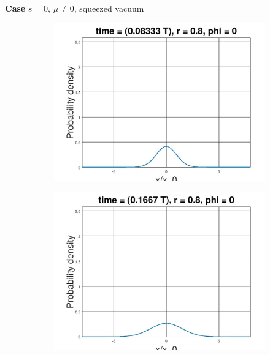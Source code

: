 \documentclass[12pt, twoside]{article}
\begin{document}
\textbf{Case} $s = 0$, $\mu \neq 0$, squeezed vacuum
\begin{figure}[h!]
	\label{fig:squeezed_vacuum}
	\centering
	\begin{subfigure}[h!]{0.3\linewidth}
		\includegraphics[width=\linewidth]{graphs/squeezed_vacuum/1.jpg}
	\end{subfigure}
	\begin{subfigure}[h!]{0.3\linewidth}
		\includegraphics[width=\linewidth]{graphs/squeezed_vacuum/2.jpg}
	\end{subfigure}
	\begin{subfigure}[h!]{0.3\linewidth}

\end{subfigure}
\end{figure}
\end{document}

